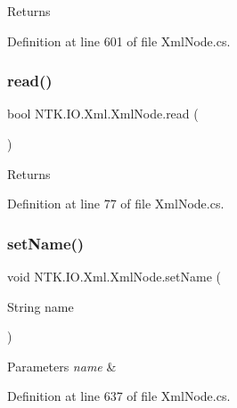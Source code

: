 \begin{DoxyReturn}{Returns}

\end{DoxyReturn}


Definition at line 601 of file Xml\+Node.\+cs.

\mbox{\label{class_n_t_k_1_1_i_o_1_1_xml_1_1_xml_node_a4aff059c05655efaa40a63b0ff01a4c0}} 
\subsubsection{\texorpdfstring{read()}{read()}}
{\footnotesize\ttfamily bool N\+T\+K.\+I\+O.\+Xml.\+Xml\+Node.\+read (\begin{DoxyParamCaption}{ }\end{DoxyParamCaption})}





\begin{DoxyReturn}{Returns}

\end{DoxyReturn}


Definition at line 77 of file Xml\+Node.\+cs.

\mbox{\label{class_n_t_k_1_1_i_o_1_1_xml_1_1_xml_node_a3111f4432fb3cda300c350ae39ef9464}} 
\subsubsection{\texorpdfstring{setName()}{setName()}}
{\footnotesize\ttfamily void N\+T\+K.\+I\+O.\+Xml.\+Xml\+Node.\+set\+Name (\begin{DoxyParamCaption}\item[{String}]{name }\end{DoxyParamCaption})}






\begin{DoxyParams}{Parameters}
{\em name} & \\
\hline
\end{DoxyParams}


Definition at line 637 of file Xml\+Node.\+cs.

